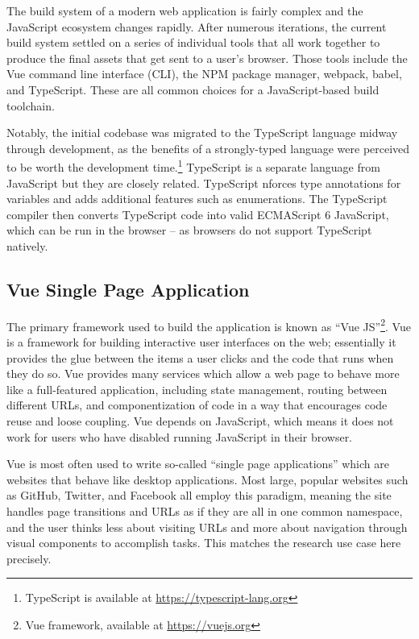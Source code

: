 The build system of a modern web application is fairly complex and the JavaScript ecosystem changes rapidly. After numerous iterations, the current build system settled on a series of individual tools that all work together to produce the final assets that get sent to a user's browser. Those tools include the Vue command line interface (CLI), the NPM package manager, webpack, babel, and TypeScript. These are all common choices for a JavaScript-based build toolchain.

Notably, the initial codebase was migrated to the TypeScript language midway through development, as the benefits of a strongly-typed language were perceived to be worth the development time.\footnote{TypeScript is available at \url{https://typescript-lang.org}} TypeScript is a separate language from JavaScript but they are closely related. TypeScript nforces type annotations for variables and adds additional features such as enumerations. The TypeScript compiler then converts TypeScript code into valid ECMAScript 6 JavaScript, which can be run in the browser -- as browsers do not support TypeScript natively.

\hypertarget{vue-single-page-application}{%
\subsection{Vue Single Page Application}\label{vue-single-page-application}}

The primary framework used to build the application is known as ``Vue JS''\footnote{Vue framework, available at \url{https://vuejs.org}}. Vue is a framework for building interactive user interfaces on the web; essentially it provides the glue between the items a user clicks and the code that runs when they do so. Vue provides many services which allow a web page to behave more like a full-featured application, including state management, routing between different URLs, and componentization of code in a way that encourages code reuse and loose coupling. Vue depends on JavaScript, which means it does not work for users who have disabled running JavaScript in their browser.

Vue is most often used to write so-called ``single page applications'' which are websites that behave like desktop applications. Most large, popular websites such as GitHub, Twitter, and Facebook all employ this paradigm, meaning the site handles page transitions and URLs as if they are all in one common namespace, and the user thinks less about visiting URLs and more about navigation through visual components to accomplish tasks. This matches the research use case here precisely.

